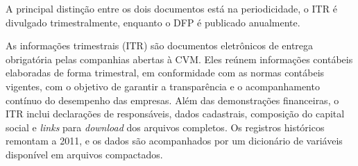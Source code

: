 


A principal distinção entre os dois documentos está na periodicidade, o ITR é divulgado trimestralmente, enquanto o DFP é publicado anualmente.


As informações trimestrais (ITR) são documentos eletrônicos de entrega obrigatória pelas companhias abertas à CVM. Eles reúnem informações contábeis elaboradas de forma trimestral, em conformidade com as normas contábeis vigentes, com o objetivo de garantir a transparência e o acompanhamento contínuo do desempenho das empresas. Além das demonstrações financeiras, o ITR inclui declarações de responsáveis, dados cadastrais, composição do capital social e \textit{links} para \textit{download} dos arquivos completos. Os registros históricos remontam a 2011, e os dados são acompanhados por um dicionário de variáveis disponível em arquivos compactados.


